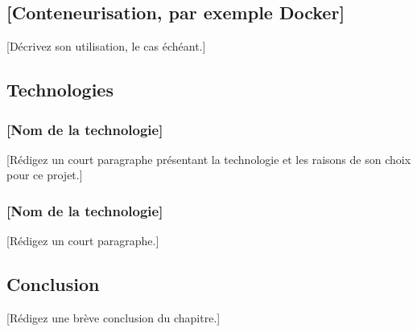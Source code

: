 \subsection{[Conteneurisation, par exemple Docker]}
[Décrivez son utilisation, le cas échéant.]

\subsection{Technologies}

\subsubsection{[Nom de la technologie]}
[Rédigez un court paragraphe présentant la technologie et les raisons de son choix pour ce projet.]

\subsubsection{[Nom de la technologie]}
[Rédigez un court paragraphe.]

\subsection{Conclusion}
[Rédigez une brève conclusion du chapitre.]

